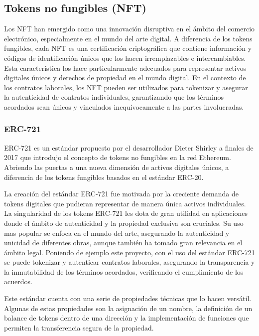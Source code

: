 \subsection{Tokens no fungibles (NFT)}

Los NFT han emergido como una innovación disruptiva en el ámbito del comercio electrónico, especialmente en el mundo del arte digital.
A diferencia de los tokens fungibles, cada NFT es una certificación criptográfica que contiene información y códigos de identificación únicos que los hacen irremplazables e intercambiables.
Esta característica los hace particularmente adecuados para representar activos digitales únicos y derechos de propiedad en el mundo digital.
En el contexto de los contratos laborales, los NFT pueden ser utilizados para tokenizar y asegurar la autenticidad de contratos individuales, garantizando que los términos acordados sean únicos y vinculados inequívocamente a las partes involucradas.~\cite{NFTintroducción}


\subsubsection{ERC-721}

ERC-721 es un estándar propuesto por el desarrollador Dieter Shirley a finales de 2017 que introdujo el concepto de tokens no fungibles en la red Ethereum. ~\cite{ERC721Introducción}
Abriendo las puertas a una nueva dimensión de activos digitales únicos, a diferencia de los tokens fungibles basados en el estándar ERC-20.

La creación del estándar ERC-721 fue motivada por la creciente demanda de tokens digitales que pudieran representar de manera única activos individuales.
La singularidad de los tokens ERC-721 les dota de gran utilidad en aplicaciones donde el ámbito de autenticidad y la propiedad exclusiva son cruciales.
Su uso mas popular se enfoca en el mundo del arte, asegurando la autenticidad y unicidad de diferentes obras, aunque también ha tomado gran relevancia en el ámbito legal. 
Poniendo de ejemplo este proyecto, con el uso del estándar ERC-721 se puede tokenizar y autenticar contratos laborales, asegurando la transparencia y la inmutabilidad de los términos acordados, verificando el cumplimiento de los acuerdos.

Este estándar cuenta con una serie de propiedades técnicas que lo hacen versátil. Algunas de estas propiedades son la asignación de un nombre, la definición de un balance de tokens dentro de una dirección y la implementación de funciones que permiten la transferencia segura de la propiedad.



